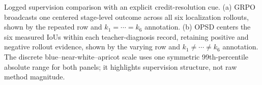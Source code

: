 \caption{Logged supervision comparison with an explicit credit-resolution cue. (a) GRPO broadcasts one centered stage-level outcome across all six localization rollouts, shown by the repeated row and $k_1=\cdots=k_6$ annotation. (b) OPSD centers the six measured IoUs within each teacher-diagnosis record, retaining positive and negative rollout evidence, shown by the varying row and $k_1\ne\cdots\ne k_6$ annotation. The discrete blue--near-white--apricot scale uses one symmetric 99th-percentile absolute range for both panels; it highlights supervision structure, not raw method magnitude.}
